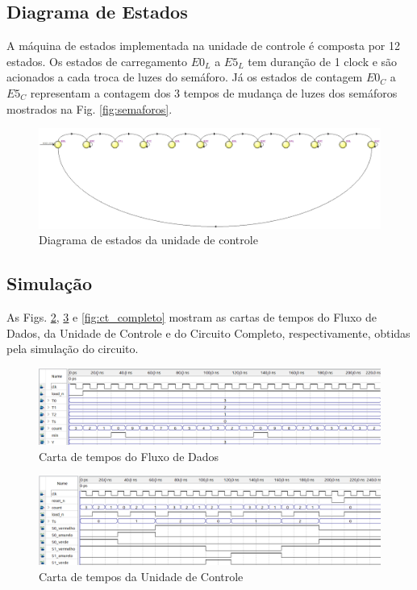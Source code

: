 \documentclass[a4,12pt]{horizon-theme}
\begin{document}
\subsection{Diagrama de Estados}
A máquina de estados implementada na unidade de controle é composta por 12 estados. Os estados de carregamento $E0_L$ a $E5_L$ tem duranção de 1 clock e são acionados a cada troca de luzes do semáforo. Já os estados de contagem $E0_C$ a $E5_C$ representam a contagem dos 3 tempos de mudança de luzes dos semáforos mostrados na Fig. \ref{fig:semaforos}.

\begin{figure}[!ht]
    \centering
    \includegraphics[width=\textwidth]{estados.png}
    \caption{Diagrama de estados da unidade de controle}
    \label{fig:estados}
\end{figure}




\subsection{Simulação}

As Figs. \ref{fig:ct_fd}, \ref{fig:ct_uc} e \ref{fig:ct_completo} mostram as cartas de tempos do Fluxo de Dados, da Unidade de Controle e do Circuito Completo, respectivamente, obtidas pela simulação do circuito.

\begin{figure}[!ht]
    \centering
    \includegraphics[width=\textwidth]{sem_fd.png}
    \caption{Carta de tempos do Fluxo de Dados}
    \label{fig:ct_fd}
\end{figure}

\begin{figure}[!ht]
    \centering
    \includegraphics[width=\textwidth]{sem_uc.png}
    \caption{Carta de tempos da Unidade de Controle}
    \label{fig:ct_uc}
\end{figure}
\end{document}
